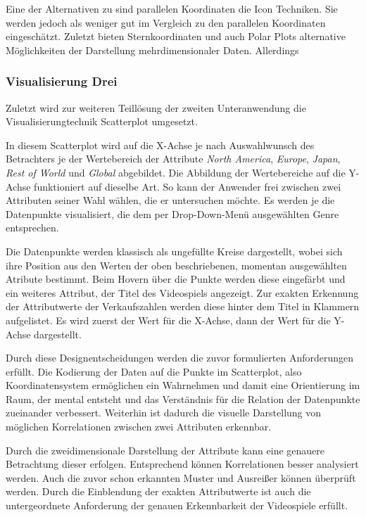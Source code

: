 \documentclass[usegeometry=true]{scrartcl}
\begin{document}
Eine der Alternativen zu sind parallelen Koordinaten die Icon Techniken. 
Sie werden jedoch als weniger gut im Vergleich zu den parallelen Koordinaten eingeschätzt.
Zuletzt bieten Sternkoordinaten und auch Polar Plots alternative Möglichkeiten der Darstellung mehrdimensionaler Daten. Allerdings

\subsubsection{Visualisierung Drei}
Zuletzt wird zur weiteren Teillösung der zweiten Unteranwendung die Visualisierungtechnik Scatterplot umgesetzt. 

In diesem Scatterplot wird auf die X-Achse je nach Auswahlwunsch des Betrachters je der Wertebereich der Attribute \textit{North America}, \textit{Europe}, \textit{Japan}, \textit{Rest of World} und \textit{Global} abgebildet.
Die Abbildung der Wertebereiche auf die Y-Achse funktioniert auf dieselbe Art. 
So kann der Anwender frei zwischen zwei Attributen seiner Wahl wählen, die er untersuchen möchte.
Es werden je die Datenpunkte visualisiert, die dem per Drop-Down-Menü ausgewählten Genre entsprechen. 

Die Datenpunkte werden klassisch als ungefüllte Kreise dargestellt, wobei sich ihre Position aus den Werten der oben beschriebenen, momentan ausgewählten Atribute bestimmt. 
Beim Hovern über die Punkte werden diese eingefärbt und ein weiteres Attribut, der Titel des Videospiels angezeigt. 
Zur exakten Erkennung der Attributwerte der Verkaufszahlen werden diese hinter dem Titel in Klammern aufgelistet. 
Es wird zuerst der Wert für die X-Achse, dann der Wert für die Y-Achse dargestellt.

Durch diese Designentscheidungen werden die zuvor formulierten Anforderungen erfüllt. 
Die Kodierung der Daten auf die Punkte im Scatterplot, also Koordinatensystem ermöglichen ein Wahrnehmen und damit eine Orientierung im Raum, der mental entsteht und das Verständnis für die Relation der Datenpunkte zueinander verbessert.
Weiterhin ist dadurch die visuelle Darstellung von möglichen Korrelationen zwischen zwei Attributen erkennbar. 

Durch die zweidimensionale Darstellung der Attribute kann eine genauere Betrachtung dieser erfolgen. 
Entsprechend können Korrelationen besser analysiert werden.
Auch die zuvor schon erkannten Muster und Ausreißer können überprüft werden.
Durch die Einblendung der exakten Attributwerte ist auch die untergeordnete Anforderung der genauen Erkennbarkeit der Videospiele erfüllt. 
\end{document}

